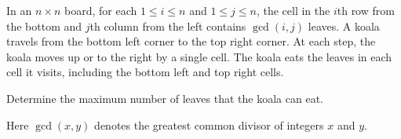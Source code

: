 In an $n\times n$ board, for each $1\leq i\leq n$ and $1\leq j\leq n$, the cell in the $i$th row from the bottom and $j$th column from the left contains $\gcd(i,j)$ leaves. A koala travels from the bottom left corner to the top right corner. At each step, the koala moves up or to the right by a single cell. The koala eats the leaves in each cell it visits, including the bottom left and top right cells.

Determine the maximum number of leaves that the koala can eat.

Here $\gcd(x,y)$ denotes the greatest common divisor of integers $x$ and $y$.

